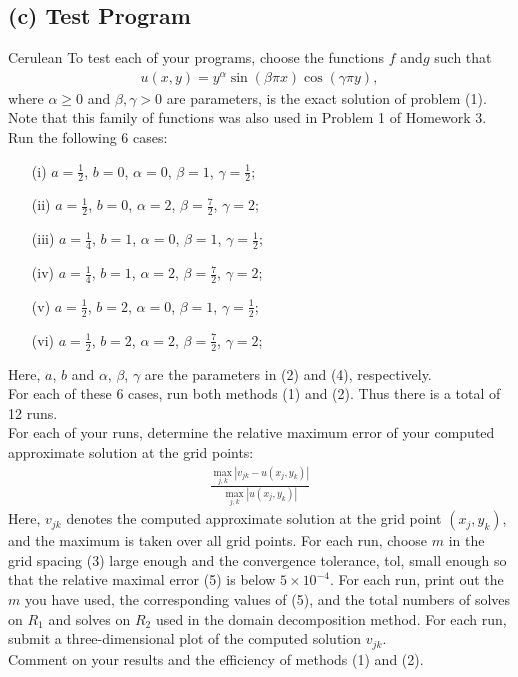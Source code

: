 \documentclass[12pt]{article}
\begin{document}
\subsection{(c) Test Program}\begin{mybox}{Cerulean}{}
To test each of your programs, choose the functions $f$ and$g$ such that
\begin{align*}
u(x,y) = y^\alpha\sin(\beta\pi x)\cos(\gamma\pi y), \tag{4}
\end{align*}
where $\alpha \geq 0$ and $\beta, \gamma > 0$ are parameters, is the exact solution of problem (1).  Note that this family of functions was also used in Problem 1 of Homework 3.\\
Run the following 6 cases:
\begin{itemize}
\item[(i)] $a = \frac{1}{2}$, $b = 0$, $\alpha = 0$, $\beta = 1$, $\gamma = \frac{1}{2}$;
\item[(ii)] $a = \frac{1}{2}$, $b = 0$, $\alpha = 2$, $\beta = \frac{7}{2}$, $\gamma = 2$;
\item[(iii)] $a = \frac{1}{4}$, $b = 1$, $\alpha = 0$, $\beta = 1$, $\gamma = \frac{1}{2}$;
\item[(iv)] $a = \frac{1}{4}$, $b = 1$, $\alpha = 2$, $\beta = \frac{7}{2}$, $\gamma = 2$;
\item[(v)] $a = \frac{1}{2}$, $b = 2$, $\alpha = 0$, $\beta = 1$, $\gamma = \frac{1}{2}$;
\item[(vi)] $a = \frac{1}{2}$, $b = 2$, $\alpha = 2$, $\beta = \frac{7}{2}$, $\gamma = 2$;
\end{itemize}
Here, $a$, $b$ and $\alpha$, $\beta$, $\gamma$ are the parameters in (2) and (4), respectively.\\
For each of these 6 cases, run both methods (1) and (2).  Thus there is a total of 12 runs.\\
For each of your runs, determine the relative maximum error of your computed approximate solution at the grid points:
\begin{align*}
\frac{\max_{j,k}|v_{jk} - u(x_j,y_k)|}{\max_{j,k}|u(x_j,y_k)|} \tag{5}
\end{align*}
Here, $v_{jk}$ denotes the computed approximate solution at the grid point $(x_j,y_k)$, and the maximum is taken over all grid points.  For each run, choose $m$ in the grid spacing (3) large enough and the convergence tolerance, tol, small enough so that the relative maximal error (5) is below $5\times 10^{-4}$.  For each run, print out the $m$ you have used, the corresponding values of (5), and the total numbers of solves on $R_1$ and solves on $R_2$ used in the domain decomposition method.  For each run, submit a three-dimensional plot of the computed solution $v_{jk}$.\\
Comment on your results and the efficiency of methods (1) and (2).
\end{mybox}\text{ }\\
\end{document}
